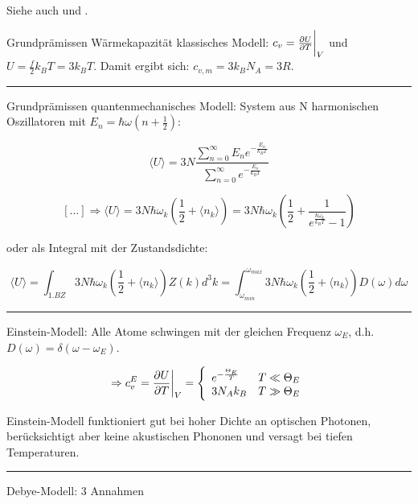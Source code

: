 \label{q:57}

Siehe auch  und .

Grundprämissen Wärmekapazität klassisches Modell: \( c_v = \pdv{U}{T} \bigg\rvert _V \) und \( U = \frac{f}{2} k_B T = 3 k_B T \). Damit ergibt sich: \( c_{v, m} = 3 k_B N_A = 3R\). 

\vspace{.2cm}
\hrule
\vspace{.2cm}

Grundprämissen quantenmechanisches Modell: System aus N harmonischen Oszillatoren mit \( E_n = \hbar \omega (n + \frac{1}{2})\): 

\[ \langle U \rangle = 3N \frac{\sum_{n=0}^\infty E_n e^{-\frac{E_n}{k_B T}}}{\sum_{n=0}^\infty e^{-\frac{E_n}{k_B T}}} \] 

\[ [\dots] \Rightarrow \langle U \rangle = 3N\hbar\omega_k\left(\frac{1}{2}+\langle n_k\rangle \right) = 3N\hbar\omega_k\left(\frac{1}{2}+ \frac{1}{e^{\frac{\hbar\omega_k}{k_BT}}-1} \right) \] 

oder als Integral mit der Zustandsdichte:

\[ \langle U \rangle = \displaystyle\int_{1. BZ} 3N\hbar\omega_k\left(\frac{1}{2}+\langle n_k\rangle \right) Z(k) d^3k = \displaystyle\int_{\omega_{min}}^{\omega_{max}} 3N\hbar\omega_k\left(\frac{1}{2}+\langle n_k\rangle \right) D(\omega) d\omega\]

\vspace{.2cm}
\hrule
\vspace{.2cm}

Einstein-Modell: Alle Atome schwingen mit der gleichen Frequenz $\omega_E$, d.h. $D(\omega) = \delta(\omega-\omega_E)$.

\[\Rightarrow c_v^E  = \pdv{U}{T} \bigg\rvert _V  = \left\{ \begin{array}{ll}
    e^{-\frac{\Theta_E}{T}} & T \ll \Theta_E \\
    3 N_A k_B  & T \gg \Theta_E \\
    \end{array} \right. 
\]

Einstein-Modell funktioniert gut bei hoher Dichte an optischen Photonen, berücksichtigt aber keine akustischen Phononen und versagt bei tiefen Temperaturen.

\vspace{.2cm}
\hrule
\vspace{.2cm}

Debye-Modell: 3 Annahmen

